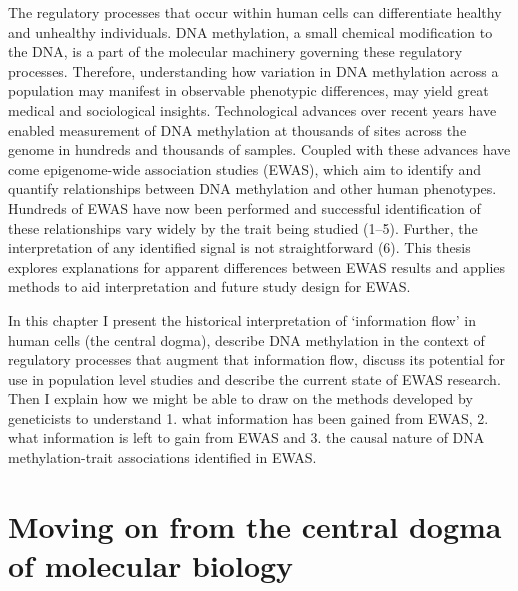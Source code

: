 \documentclass[11pt,twoside]{bristolthesis}
\begin{document}
The regulatory processes that occur within human cells can differentiate healthy and unhealthy individuals. DNA methylation, a small chemical modification to the DNA, is a part of the molecular machinery governing these regulatory processes. Therefore, understanding how variation in DNA methylation across a population may manifest in observable phenotypic differences, may yield great medical and sociological insights. Technological advances over recent years have enabled measurement of DNA methylation at thousands of sites across the genome in hundreds and thousands of samples. Coupled with these advances have come epigenome-wide association studies (EWAS), which aim to identify and quantify relationships between DNA methylation and other human phenotypes. Hundreds of EWAS have now been performed and successful identification of these relationships vary widely by the trait being studied (1--5). Further, the interpretation of any identified signal is not straightforward (6). This thesis explores explanations for apparent differences between EWAS results and applies methods to aid interpretation and future study design for EWAS.

In this chapter I present the historical interpretation of `information flow' in human cells (the central dogma), describe DNA methylation in the context of regulatory processes that augment that information flow, discuss its potential for use in population level studies and describe the current state of EWAS research. Then I explain how we might be able to draw on the methods developed by geneticists to understand 1. what information has been gained from EWAS, 2. what information is left to gain from EWAS and 3. the causal nature of DNA methylation-trait associations identified in EWAS.

\hypertarget{central-dogma}{%
\section{Moving on from the central dogma of molecular biology}\label{central-dogma}}
\end{document}
